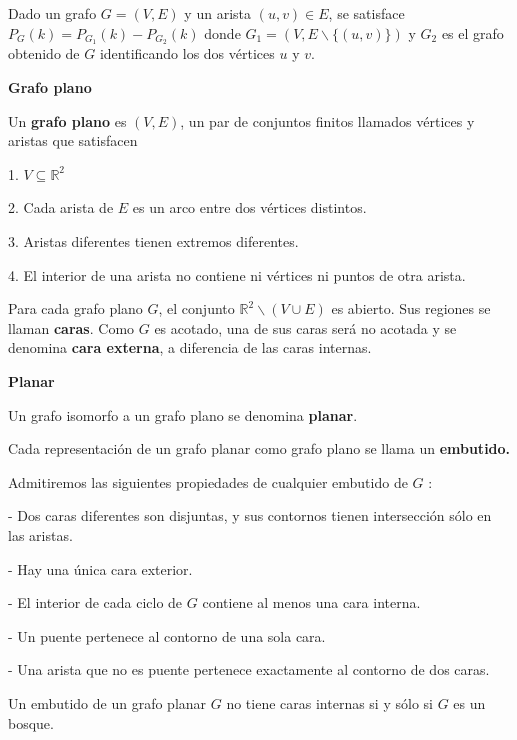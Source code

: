 \documentclass[openany]{book}
\begin{document}
\begin{theorem}
  Dado un grafo $G=(V, E)$ y un arista $(u, v) \in E$, se satisface $P_{G}(k)=P_{G_{1}}(k)-P_{G_{2}}(k)$ donde $G_{1}=(V, E \backslash\{(u, v)\})$ y $G_{2}$ es el grafo obtenido de $G$ identificando los dos vértices $u$ y $v$.
\end{theorem}

\begin{definition}
  { \color{turquoise} \textbf{Grafo plano}}

  Un \textbf{grafo plano} es $(V, E)$, un par de conjuntos finitos llamados vértices y aristas que satisfacen

  1. $V \subseteq \mathbb{R}^{2}$

  2. Cada arista de $E$ es un arco entre dos vértices distintos.

  3. Aristas diferentes tienen extremos diferentes.

  4. El interior de una arista no contiene ni vértices ni puntos de otra arista.

  Para cada grafo plano $G$, el conjunto $\mathbb{R}^{2} \backslash(V \cup E)$ es abierto. Sus regiones se llaman \textbf{caras}. Como $G$ es acotado, una de sus caras será no acotada y se denomina \textbf{cara externa}, a diferencia de las caras internas.
\end{definition}

\begin{definition}
  { \color{turquoise} \textbf{Planar}}

  Un grafo isomorfo a un grafo plano se denomina \textbf{planar}.

  Cada representación de un grafo planar como grafo plano se llama un \textbf{embutido.}
\end{definition}

Admitiremos las siguientes propiedades de cualquier embutido de $G$ :

- Dos caras diferentes son disjuntas, y sus contornos tienen intersección sólo en las aristas.

- Hay una única cara exterior.

- El interior de cada ciclo de $G$ contiene al menos una cara interna.

- Un puente pertenece al contorno de una sola cara.

- Una arista que no es puente pertenece exactamente al contorno de dos caras.

\begin{proposition}
  Un embutido de un grafo planar $G$ no tiene caras internas si y sólo si $G$ es un bosque.
\end{proposition}
\end{document}

